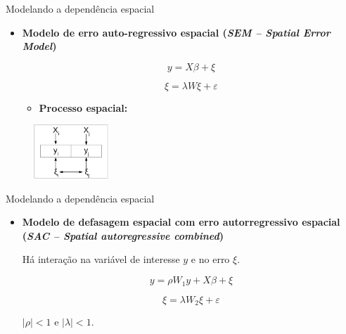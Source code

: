 \documentclass[aspectratio=169]{beamer}
\begin{document}
\begin{frame}{Modelando a dependência espacial}
    \begin{itemize}
        \item \textbf{Modelo de erro auto-regressivo espacial (\textit{SEM -- Spatial Error Model})}
        \vspace{0.5cm}
        \begin{block}{}
            $$y = X\beta+ \xi $$  
            
            $$\xi = \lambda W \xi + \varepsilon$$
        \end{block}
        \noindent 
        \begin{itemize}
            \item \textbf{Processo espacial:}
        \end{itemize}
    \end{itemize}
    \begin{figure}
		\centering
		\includegraphics[width=0.25\textwidth]{img/reg_sem.png}
	\end{figure}
\end{frame}

\begin{frame}{Modelando a dependência espacial}
    \begin{itemize}
        \item \textbf{Modelo de defasagem espacial com erro autorregressivo espacial (\textit{SAC -- Spatial autoregressive combined})}
        
        \vspace{0.2cm}
        Há interação na variável de interesse $y$ e no erro $\xi$.
        \begin{block}{}
            $$y = \rho W_1y +  X\beta+ \xi $$  
            
            $$\xi = \lambda W_2 \xi + \varepsilon$$
        \end{block}
        \noindent $|\rho|<1$ e $|\lambda|<1$. 
    \end{itemize}
\end{frame}
\end{document}
